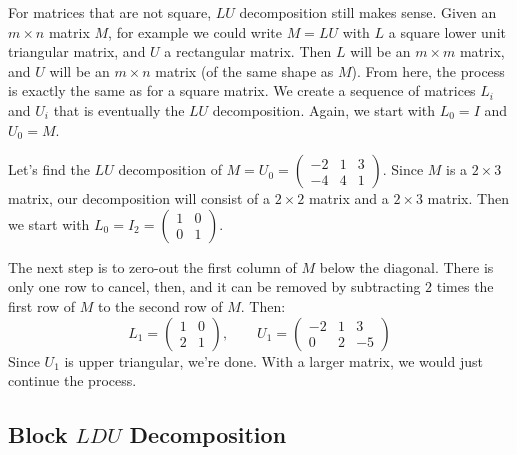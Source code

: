 
For matrices that are not square, $LU$ decomposition still makes sense.  Given an $m\times n$ matrix $M$, for example we could write $M=LU$ with $L$ a square lower unit triangular matrix, and $U$ a rectangular matrix.  Then $L$ will be an $m\times m$ matrix, and $U$ will be an $m\times n$ matrix (of the same shape as $M$).  From here, the process is exactly the same as for a square matrix.  We create a sequence of matrices $L_i$ and $U_i$ that is eventually the $LU$ decomposition.  Again, we start with $L_0=I$ and $U_0=M$.

\begin{example}
Let's find the $LU$ decomposition of $M=U_0=\begin{pmatrix}
-2 & 1 & 3 \\
-4 & 4 & 1 
\end{pmatrix}$.  Since $M$ is a $2\times 3$ matrix, our decomposition will consist of a $2\times 2$ matrix and a $2\times 3$ matrix.  Then we start with $L_0=I_2=\begin{pmatrix}
1 & 0 \\
0 & 1
\end{pmatrix}$.

The next step is to zero-out the first column of $M$ below the diagonal.  There is only one row to cancel, then, and it can be removed by subtracting $2$ times the first row of $M$ to the second row of $M$.  Then:
\[
L_1=\begin{pmatrix}
1 & 0 \\
2 & 1
\end{pmatrix}, \qquad 
U_1 = \begin{pmatrix}
-2 & 1 & 3 \\
0 & 2 & -5 
\end{pmatrix}
\]
Since $U_1$ is upper triangular, we're done.  With a larger matrix, we would just continue the process.
\end{example}





\subsection{Block $LDU$ Decomposition}

